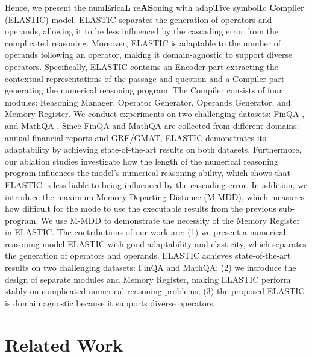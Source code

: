 \documentclass{article}
\begin{document}
Hence, we present the num\textbf{E}rica\textbf{L} re\textbf{AS}oning with adap\textbf{T}ive symbol\textbf{I}c \textbf{C}ompiler (ELASTIC) model. ELASTIC separates the generation of operators and operands, allowing it to be less influenced by the cascading error from the complicated reasoning. Moreover, ELASTIC is adaptable to the number of operands following an operator, making it domain-agnostic to support diverse operators. Specifically, ELASTIC contains an Encoder part extracting the contextual representations of the passage and question and a Compiler part generating the numerical reasoning program. The Compiler consists of four modules: Reasoning Manager, Operator Generator, Operands Generator, and Memory Register. We conduct experiments on two challenging datasets: FinQA \cite{finqa}, and MathQA \cite{MathQA}. Since FinQA and MathQA are collected from different domains: annual financial reports and GRE/GMAT, ELASTIC demonstrates its adaptability by achieving state-of-the-art results on both datasets. Furthermore, our ablation studies investigate how the length of the numerical reasoning program influences the model's numerical reasoning ability, which shows that ELASTIC is less liable to being influenced by the cascading error. In addition, we introduce the maximum Memory Departing Distance (M-MDD), which measures how difficult for the mode to use the executable results from the previous sub-program. We use M-MDD to demonstrate the necessity of the Memory Register in ELASTIC. The contributions of our work are: (1) we present a numerical reasoning model ELASTIC with good adaptability and elasticity, which separates the generation of operators and operands. ELASTIC achieves state-of-the-art results on two challenging datasets: FinQA and MathQA; (2) we introduce the design of separate modules and Memory Register, making ELASTIC perform stably on complicated numerical reasoning problems; (3) the proposed ELASTIC is domain agnostic because it supports diverse operators.



\section{Related Work}
\end{document}

